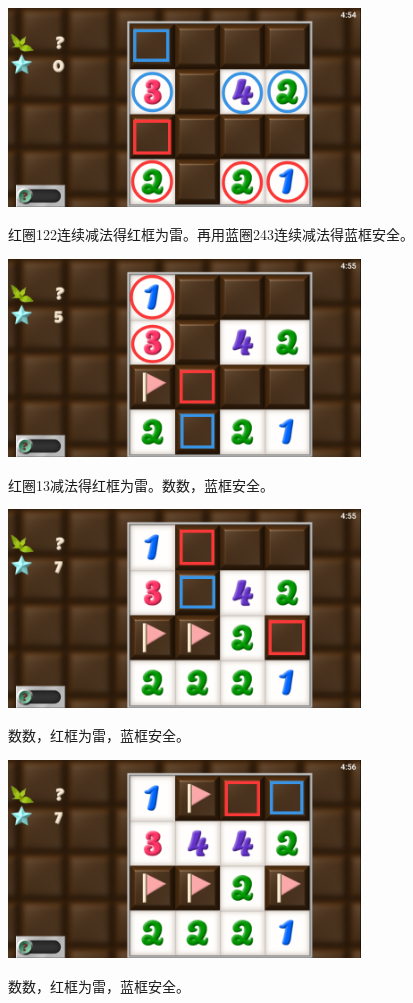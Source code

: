 \subsection{} %
\begin{center}
    \includegraphics[width=0.7\textwidth]{puzzle/55-1.png}
\end{center}
红圈122连续减法得红框为雷。再用蓝圈243连续减法得蓝框安全。
\begin{center}
    \includegraphics[width=0.7\textwidth]{puzzle/55-2.png}
\end{center}
红圈13减法得红框为雷。数数，蓝框安全。
\begin{center}
    \includegraphics[width=0.7\textwidth]{puzzle/55-3.png}
\end{center}
数数，红框为雷，蓝框安全。
\begin{center}
    \includegraphics[width=0.7\textwidth]{puzzle/55-4.png}
\end{center}
数数，红框为雷，蓝框安全。

